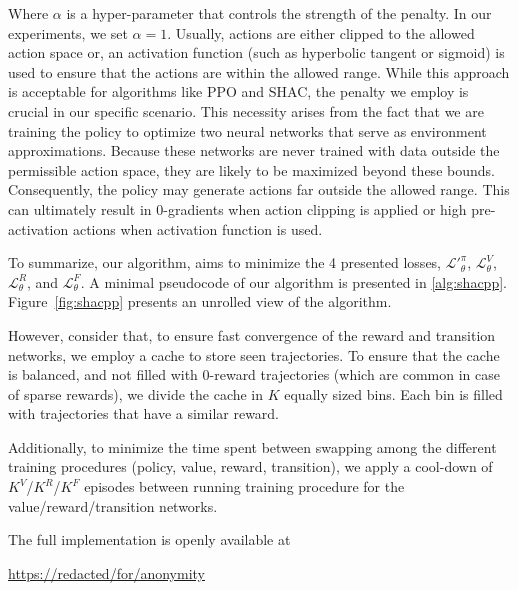     Where $\alpha$ is a hyper-parameter that controls the strength of the penalty. In our experiments, we set $\alpha=1$. Usually, actions are either clipped to the allowed action space or, an activation function (such as hyperbolic tangent or sigmoid) is used to ensure that the actions are within the allowed range. While this approach is acceptable for algorithms like PPO and SHAC, the penalty we employ is crucial in our specific scenario. This necessity arises from the fact that we are training the policy to optimize two neural networks that serve as environment approximations. Because these networks are never trained with data outside the permissible action space, they are likely to be maximized beyond these bounds. Consequently, the policy may generate actions far outside the allowed range. This can ultimately result in 0-gradients when action clipping is applied or high pre-activation actions when activation function is used. 

To summarize, our algorithm, aims to minimize the 4 presented losses, $\mathcal{L'}_\theta^{\pi}$, $\mathcal{L}_\theta^V$, $\mathcal{L}_\theta^R$, and $\mathcal{L}_\theta^F$. A minimal pseudocode of our algorithm is presented in \ref{alg:shacpp}. Figure~\ref{fig:shacpp} presents an unrolled view of the \fname{} algorithm.

However, consider that, to ensure fast convergence of the reward and transition networks, we employ a cache to store seen trajectories. To ensure that the cache is balanced, and not filled with $0$-reward trajectories (which are common in case of sparse rewards), we divide the cache in $K$ equally sized bins. Each bin is filled with trajectories that have a similar reward. 

Additionally, to minimize the time spent between swapping among the different training procedures (policy, value, reward, transition), we apply a cool-down of $K^V$/$K^R$/$K^F$ episodes between running training procedure for the value/reward/transition networks. 

The full implementation is openly available at 
\begin{center}
\url{https://redacted/for/anonymity}
\end{center}

